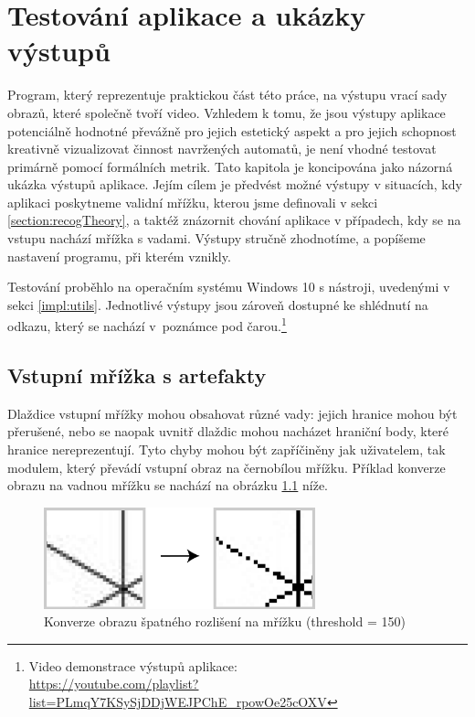 \chapter{Testování aplikace a ukázky výstupů} 
\label{testing}

Program, který reprezentuje praktickou část této práce, na výstupu vrací sady obrazů, které společně tvoří video. Vzhledem k tomu, že jsou výstupy aplikace potenciálně hodnotné převážně pro jejich estetický aspekt a pro jejich schopnost kreativně vizualizovat činnost navržených automatů, je není vhodné testovat primárně pomocí formálních metrik. Tato kapitola je koncipována jako názorná ukázka výstupů aplikace. Jejím cílem je předvést možné výstupy v situacích, kdy aplikaci poskytneme validní mřížku, kterou jsme definovali v sekci \ref{section:recogTheory}, a taktéž znázornit chování aplikace v případech, kdy se na vstupu nachází mřížka s vadami. Výstupy stručně zhodnotíme, a popíšeme nastavení programu, při kterém vznikly. 

Testování proběhlo na operačním systému Windows 10 s nástroji, uvedenými v sekci \ref{impl:utils}. Jednotlivé výstupy jsou zároveň dostupné ke shlédnutí na odkazu, který se nachází v~poznámce pod čarou.\footnote{Video demonstrace výstupů aplikace: \\ \url{https://youtube.com/playlist?list=PLmqY7KSySjDDjWEJPChE_rpowOe25cOXV}}

\section{Vstupní mřížka s artefakty}

Dlaždice vstupní mřížky mohou obsahovat různé vady: jejich hranice mohou být přerušené, nebo se naopak uvnitř dlaždic mohou nacházet hraniční body, které hranice nereprezentují. Tyto chyby mohou být zapříčiněny jak uživatelem, tak modulem, který převádí vstupní obraz na černobílou mřížku. Příklad konverze obrazu na vadnou mřížku se nachází na obrázku \ref{fig:KonverzeSpatneMrizky} níže.

\begin{figure}[H]
    \centering
    \includegraphics[width=0.7\textwidth]{obrazky-figures/KonverzeSpatneMrizky.pdf}
    \caption{Konverze obrazu špatného rozlišení na mřížku (threshold = 150)}
    \label{fig:KonverzeSpatneMrizky}
\end{figure}

